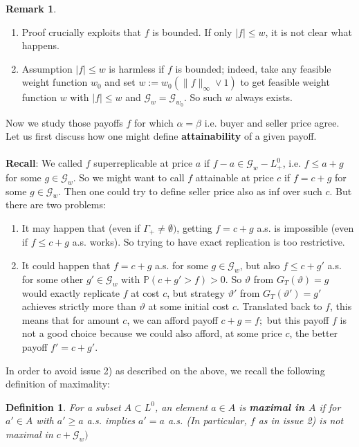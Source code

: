 \documentclass[12pt,a4paper, twoside]{article}
\newtheorem{defn}{Definition}[section]
\theoremstyle{definition}
\newtheorem{rem}{Remark}[section]
\newcommand{\PP}{\mathbb{P}} %
\begin{document}
\begin{rem} \
\begin{enumerate}
\item Proof crucially exploits that $f$ is bounded. If only $|f| \leq w$, it is not clear what happens.
\item Assumption $|f| \leq w$ is harmless if $f$ is bounded; indeed, take any feasible weight function $w_0$ and set $w:=w_0( \|f\|_\infty \vee 1)$ to get feasible weight function $w$ with $|f| \leq w$ and $\mathcal{G}_w= \mathcal{G}_{w_0}$. So such $w$ always exists. 
\end{enumerate}
\end{rem}
Now we study those payoffs $f$ for which $\alpha = \beta$ i.e. buyer and seller price agree. Let us first discuss how one might define \textbf{attainability} of a given payoff. 
\\\\
\textbf{Recall}: We called $f$ superreplicable at price $a$ if $f-a \in \mathcal{G}_w-L_+^0$, i.e. $f \leq a + g$ for some $g \in \mathcal{G}_w$. So we might want to call $f$ attainable at price $c$ if $f=c+g$ for some $g \in \mathcal{G}_w$. Then one could try to define seller price also as inf over such $c$. But there are two problems:
\begin{enumerate}
\item It may happen that (even if $\Gamma_+ \neq \emptyset)$, getting $f= c+g$ a.s. is impossible (even if $f \leq c+g$ a.s. works). So trying to have exact replication is too restrictive. 
\item It could happen that $f=c+g$ a.s. for some $g \in \mathcal{G}_w$, but also $f \leq c+g'$ a.s. for some other $g'\in \mathcal{G}_w$ with $\PP(c+g' > f) >0$. So $\vartheta$ from $G_T( \vartheta)=g$ would exactly replicate $f$ at cost $c$, but strategy $\vartheta'$ from $G_T( \vartheta')=g'$ achieves strictly more than $\vartheta$ at some initial cost $c$. Translated back to $f$, this means that for amount $c$, we can afford payoff $c+g=f;$ but this payoff $f$ is not a good choice because we could also afford, at some price $c$, the better payoff $f'=c+g'$.  
\end{enumerate}
In order to avoid issue 2) as described on the above, we recall the following definition of maximality:
\newpage
\begin{defn} For a subset $A \subset L^0$, an element $a \in A$ is \textbf{maximal in $A$} if for $a' \in A$ with $a' \geq a$ a.s. implies $a'=a$ a.s. (In particular, $f$ as in issue 2) is not maximal in $c+ \mathcal{G}_w)$
\end{defn}
\end{document}
